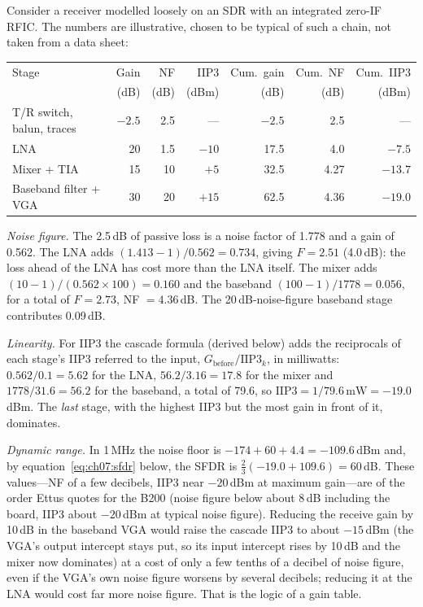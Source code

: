 
\begin{worked}
Consider a receiver modelled loosely on an SDR with an integrated zero-IF RFIC. The numbers are
illustrative, chosen to be typical of such a chain, not taken from a data sheet:
\begin{center}\small
\begin{tabular}{lrrr|rrr}
\toprule
Stage & Gain & NF & IIP3 & Cum.\ gain & Cum.\ NF & Cum.\ IIP3 \\
 & (dB) & (dB) & (dBm) & (dB) & (dB) & (dBm) \\
\midrule
T/R switch, balun, traces & $-2.5$ & 2.5 & --- & $-2.5$ & 2.5 & --- \\
LNA & 20 & 1.5 & $-10$ & 17.5 & 4.0 & $-7.5$ \\
Mixer + TIA & 15 & 10 & $+5$ & 32.5 & 4.27 & $-13.7$ \\
Baseband filter + VGA & 30 & 20 & $+15$ & 62.5 & 4.36 & $-19.0$ \\
\bottomrule
\end{tabular}
\end{center}
\emph{Noise figure.} The 2.5\,dB of passive loss is a noise factor of 1.778 and a gain of 0.562. The LNA
adds $(1.413-1)/0.562=0.734$, giving $F=2.51$ (4.0\,dB): the loss ahead of the LNA has cost more than the
LNA itself. The mixer adds $(10-1)/(0.562\times100)=0.160$ and the baseband $(100-1)/1778=0.056$, for a
total of $F=2.73$, NF $=4.36$\,dB. The 20\,dB-noise-figure baseband stage contributes 0.09\,dB.

\emph{Linearity.} For IIP3 the cascade formula (derived below) adds the reciprocals of each stage's IIP3
referred to the input, $G_{\text{before}}/\text{IIP3}_k$, in milliwatts: $0.562/0.1=5.62$ for the LNA,
$56.2/3.16=17.8$ for the mixer and $1778/31.6=56.2$ for the baseband, a total of 79.6, so
$\text{IIP3}=1/79.6\,\text{mW}=-19.0$\,dBm. The \emph{last} stage, with the highest IIP3 but the most
gain in front of it, dominates.

\emph{Dynamic range.} In 1\,MHz the noise floor is $-174+60+4.4=-109.6$\,dBm and, by
equation~\eqref{eq:ch07:sfdr} below, the SFDR is $\tfrac23(-19.0+109.6)=60$\,dB. These values---NF of a
few decibels, IIP3 near $-20$\,dBm at maximum gain---are of the order Ettus quotes for the B200 (noise
figure below about 8\,dB including the board, IIP3 about $-20$\,dBm at typical noise figure). Reducing
the receive gain by 10\,dB in the baseband VGA would raise the cascade IIP3 to about $-15$\,dBm (the
VGA's output intercept stays put, so its input intercept rises by 10\,dB and the mixer now dominates) at
a cost of only a few tenths of a decibel of noise figure, even if the VGA's own noise figure worsens by
several decibels; reducing it at the LNA would cost far more noise figure. That is the logic of a
gain table.
\end{worked}

